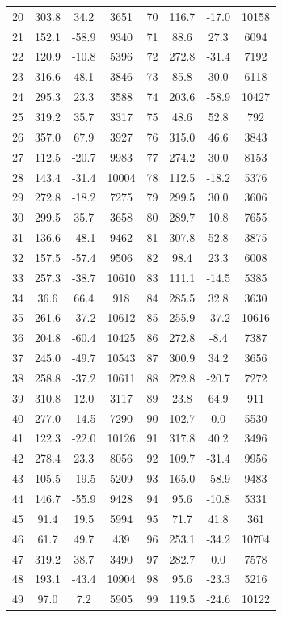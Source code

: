 \begin{table}
\begin{tabular}{cccc|cccc}
20 & 303.8 & 34.2  & 3651  & 70 & 116.7 & -17.0 & 10158 \\
21 & 152.1 & -58.9 & 9340  & 71 & 88.6  & 27.3  & 6094  \\
22 & 120.9 & -10.8 & 5396  & 72 & 272.8 & -31.4 & 7192  \\
23 & 316.6 & 48.1  & 3846  & 73 & 85.8  & 30.0  & 6118  \\
24 & 295.3 & 23.3  & 3588  & 74 & 203.6 & -58.9 & 10427 \\
25 & 319.2 & 35.7  & 3317  & 75 & 48.6  & 52.8  & 792   \\
26 & 357.0 & 67.9  & 3927  & 76 & 315.0 & 46.6  & 3843  \\
27 & 112.5 & -20.7 & 9983  & 77 & 274.2 & 30.0  & 8153  \\
28 & 143.4 & -31.4 & 10004 & 78 & 112.5 & -18.2 & 5376  \\
29 & 272.8 & -18.2 & 7275  & 79 & 299.5 & 30.0  & 3606  \\
30 & 299.5 & 35.7  & 3658  & 80 & 289.7 & 10.8  & 7655  \\
31 & 136.6 & -48.1 & 9462  & 81 & 307.8 & 52.8  & 3875  \\
32 & 157.5 & -57.4 & 9506  & 82 & 98.4  & 23.3  & 6008  \\
33 & 257.3 & -38.7 & 10610 & 83 & 111.1 & -14.5 & 5385  \\
34 & 36.6  & 66.4  & 918   & 84 & 285.5 & 32.8  & 3630  \\
35 & 261.6 & -37.2 & 10612 & 85 & 255.9 & -37.2 & 10616 \\
36 & 204.8 & -60.4 & 10425 & 86 & 272.8 & -8.4  & 7387  \\
37 & 245.0 & -49.7 & 10543 & 87 & 300.9 & 34.2  & 3656  \\
38 & 258.8 & -37.2 & 10611 & 88 & 272.8 & -20.7 & 7272  \\
39 & 310.8 & 12.0  & 3117  & 89 & 23.8  & 64.9  & 911   \\
40 & 277.0 & -14.5 & 7290  & 90 & 102.7 & 0.0   & 5530  \\
41 & 122.3 & -22.0 & 10126 & 91 & 317.8 & 40.2  & 3496  \\
42 & 278.4 & 23.3  & 8056  & 92 & 109.7 & -31.4 & 9956  \\
43 & 105.5 & -19.5 & 5209  & 93 & 165.0 & -58.9 & 9483  \\
44 & 146.7 & -55.9 & 9428  & 94 & 95.6  & -10.8 & 5331  \\
45 & 91.4  & 19.5  & 5994  & 95 & 71.7  & 41.8  & 361   \\
46 & 61.7  & 49.7  & 439   & 96 & 253.1 & -34.2 & 10704 \\
47 & 319.2 & 38.7  & 3490  & 97 & 282.7 & 0.0   & 7578  \\
48 & 193.1 & -43.4 & 10904 & 98 & 95.6  & -23.3 & 5216  \\
49 & 97.0  & 7.2   & 5905  & 99 & 119.5 & -24.6 & 10122 \\



\end{tabular}
\end{table}

